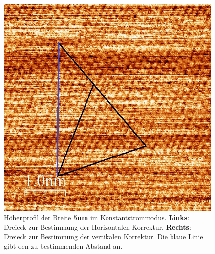 \documentclass[12pt,a4paper]{article}
\begin{document}
\begin{figure}[H]
\includegraphics[scale=0.36]{Bilder/Atome/strom5_v.jpg}
\caption{Höhenprofil der Breite \textbf{5nm} im Konstantstrommodus. \textbf{Links}: Dreieck zur Bestimmung der Horizontalen Korrektur. \textbf{Rechts}: Dreieck zur Bestimmung der vertikalen Korrektur. Die blaue Linie gibt den zu bestimmenden Abstand an.}
\end{figure}
\end{document}
